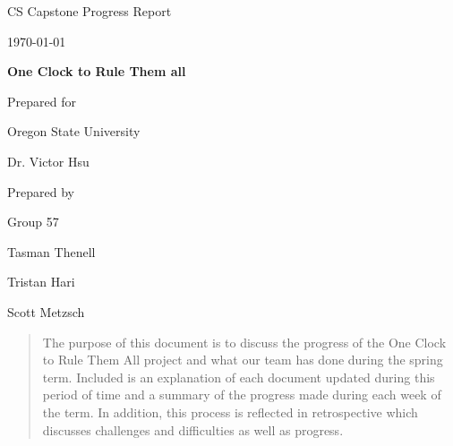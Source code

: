 \documentclass[onecolumn, draftclsnofoot,10pt, compsoc]{IEEEtran}
\def \CapstoneTeamName{     One Clock to Rule Them all}
\def \CapstoneTeamNumber{       57}
\def \GroupMemberOne{           Tasman Thenell}
\def \GroupMemberTwo{           Tristan Hari}
\def \GroupMemberThree{         Scott Metzsch}
\def \CapstoneProjectName{      One Clock to Rule Them all}
\def \CapstoneSponsorCompany{   Oregon State University}
\def \CapstoneSponsorPerson{        Dr. Victor Hsu}
\def \DocType{		%
				Progress Report
				}
\newcommand{\NameSigPair}[1]{\par
\makebox[2.75in][r]{#1} \hfil   \makebox[3.25in]{\makebox[2.25in]{\hrulefill} \hfill        \makebox[.75in]{\hrulefill}}
\par\vspace{-12pt} \textit{\tiny\noindent
\makebox[2.75in]{} \hfil        \makebox[3.25in]{\makebox[2.25in][r]{Signature} \hfill  \makebox[.75in][r]{Date}}}}
\renewcommand{\NameSigPair}[1]{#1}
\begin{document}
\begin{titlepage}
    \begin{singlespace}
        \hfill
        \par\vspace{.2in}
        \centering
        \scshape{
            \huge CS Capstone \DocType \par
            {\large\today}\par
            \vspace{.5in}
            \textbf{\Huge\CapstoneProjectName}\par
            \vfill
            {\large Prepared for}\par
            \Huge \CapstoneSponsorCompany\par
            \vspace{5pt}
            {\Large\NameSigPair{\CapstoneSponsorPerson}\par}
            {\large Prepared by }\par
            Group\CapstoneTeamNumber\par
            \vspace{5pt}
            {\Large
                \NameSigPair{\GroupMemberOne}\par
                \NameSigPair{\GroupMemberTwo}\par
                \NameSigPair{\GroupMemberThree}\par
            }
            \vspace{20pt}
        }
        \begin{abstract}
            The purpose of this document is to discuss the progress of the One Clock to Rule Them All project and what our team has done during the spring term.
Included is an explanation of each document updated during this period of time and a summary of the progress made during each week of the term.
In addition, this process is reflected in retrospective which discusses challenges and difficulties as well as progress.
        \end{abstract}
    \end{singlespace}
\end{titlepage}
\newpage
{}
\tableofcontents
\clearpage
\end{document}
